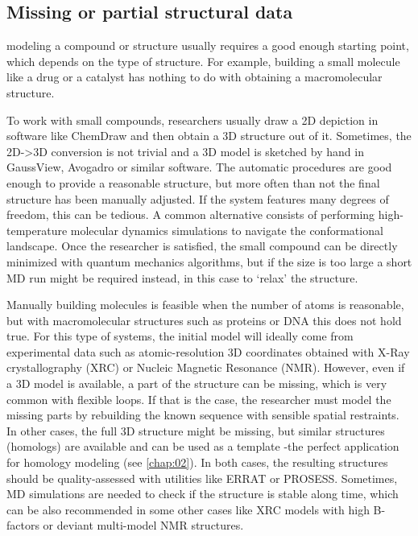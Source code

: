 \subsection{Missing or partial structural data}
modeling a compound or structure usually requires a good enough starting point, which depends on the type of structure. For example, building a small molecule like a drug or a catalyst has nothing to do with obtaining a macromolecular structure.

To work with small compounds, researchers usually draw a 2D depiction in software like ChemDraw\cite{chemdraw} and then obtain a 3D structure out of it. Sometimes, the 2D->3D conversion is not trivial and a 3D model is sketched by hand in GaussView,\cite{gaussview} Avogadro\cite{avogadro} or similar software. The automatic procedures are good enough to provide a reasonable structure, but more often than not the final structure has been manually adjusted. If the system features many degrees of freedom, this can be tedious. A common alternative consists of performing high-temperature molecular dynamics simulations to navigate the conformational landscape. Once the researcher is satisfied, the small compound can be directly minimized with quantum mechanics algorithms, but if the size is too large a short MD run might be required instead, in this case to ‘relax’ the structure.

Manually building molecules is feasible when the number of atoms is reasonable, but with macromolecular structures such as proteins or DNA this does not hold true. For this type of systems, the initial model will ideally come from experimental data such as atomic-resolution 3D coordinates obtained with X-Ray crystallography (XRC) or Nucleic Magnetic Resonance (NMR). However, even if a 3D model is available, a part of the structure can be missing, which is very common with flexible loops. If that is the case, the researcher must model the missing parts by rebuilding the known sequence with sensible spatial restraints. In other cases, the full 3D structure might be missing, but similar structures (homologs) are available and can be used as a template -the perfect application for homology modeling (see \autoref{chap:02}). In both cases, the resulting structures should be quality-assessed with utilities like ERRAT\cite{errat} or PROSESS.\cite{prosess} Sometimes, MD simulations are needed to check if the structure is stable along time, which can be also recommended in some other cases like XRC models with high B-factors or deviant multi-model NMR structures.

